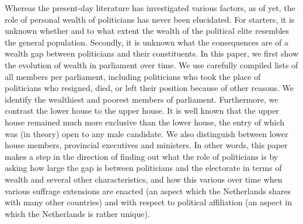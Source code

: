     Whereas the present-day literature has investigated various factors, as of yet, the role of personal wealth of politicians has never been elucidated. For starters, it is unknown whether and to what extent the wealth of the political elite resembles the general population. Secondly, it is unknown what the consequences are of a wealth gap between politicians and their constituents. In this paper, we first show the evolution of wealth in parliament over time. We use carefully compiled lists of all members per parliament, including politicians who took the place of politicians who resigned, died, or left their position because of other reasons. We identify the wealthiest and poorest members of parliament. Furthermore, we contrast the lower house to the upper house. It is well known that the upper house remained much more exclusive than the lower house, the entry of which was (in theory) open to any male candidate. \autocite{van1983toegang} We also distinguish between lower house members, provincial executives and ministers. In other words, this paper makes a step in the direction of finding out what the role of politicians is by asking how large the gap is between politicians and the electorate in terms of wealth and several other characteristics, and how this various over time when various suffrage extensions are enacted (an aspect which the Netherlands shares with many other countries) and with respect to political affiliation (an aspect in which the Netherlands is rather unique). 
